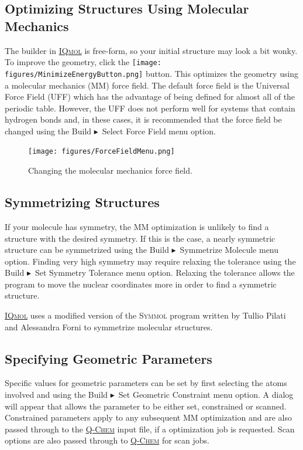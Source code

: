 \documentclass[a4paper,12pt]{article}
\newcommand{\qchem}{\href{http://q-chem.com}{{\scshape Q-Chem}}}
\newcommand{\iqmol}{\href{http://iqmol.org}{{\scshape IQmol}}}
\newcommand{\symmol}{{\scshape Symmol}}
\newcommand{\bt}{\ensuremath{\blacktriangleright}}
\begin{document}
\subsection{Optimizing Structures Using Molecular Mechanics}

The builder in \iqmol{} is free-form, so your initial structure may look a bit
wonky.  To improve the geometry, click the
\texttt{[image: figures/MinimizeEnergyButton.png]} button.  This
optimizes the geometry using a molecular mechanics (MM) force field.   The
default force field is the Universal Force Field (UFF)\cite{UFF} which has the
advantage of being defined for almost all of the periodic table.  However, the
UFF does not perform well for systems that contain hydrogen bonds and, in these
cases, it is recommended that the force field be changed using the Build \bt\
Select Force Field menu option.

\begin{figure}[h]
\begin{center}
\texttt{[image: figures/ForceFieldMenu.png]}
\caption{Changing the molecular mechanics force field.}
\end{center}
\end{figure}


\subsection{Symmetrizing Structures}

If your molecule has symmetry, the MM optimization is unlikely to find a
structure with the desired symmetry.  If this is the case, a nearly symmetric
structure can be symmetrized using the Build \bt\ Symmetrize
Molecule menu option.  Finding very high symmetry may require relaxing the
tolerance using the Build \bt\ Set Symmetry Tolerance menu
option.  Relaxing the tolerance allows the program to move the nuclear
coordinates more in order to find a symmetric structure.

\iqmol{} uses a modified version of the \symmol{}\cite{SymMol} program written
by Tullio Pilati and Alessandra Forni to symmetrize molecular structures.



\subsection{Specifying Geometric Parameters}

Specific values for geometric parameters can be set by first selecting the
atoms involved and using the Build \bt\ Set Geometric Constraint menu
option.  A dialog will appear that allows the parameter to be either set,
constrained or scanned.  Constrained parameters apply to any subsequent MM
optimization and are also passed through to the \qchem{} input file, if a
optimization job is requested.  Scan options are also passed through to
\qchem{} for scan jobs.
\end{document}
